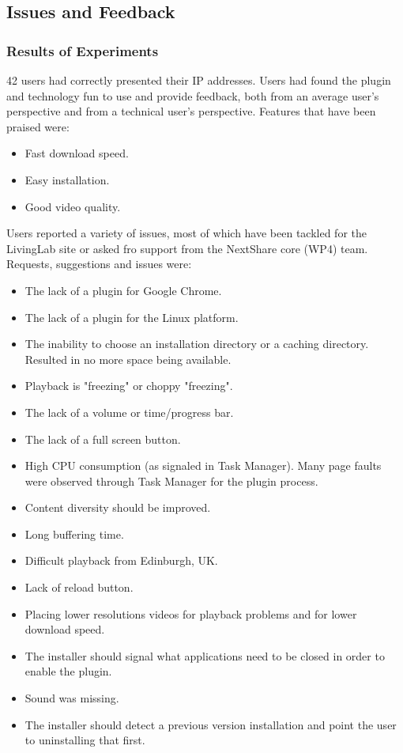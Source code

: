 \subsection{Issues and Feedback}
\label{subsec:multimedia-dist:evaluation-issues}

\subsubsection{Results of Experiments}

42 users had correctly presented their IP addresses. Users had found the
plugin and technology fun to use and provide feedback, both from an average
user's perspective and from a technical user's perspective. Features that have
been praised were:
\begin{itemize}
  \item Fast download speed.
  \item Easy installation.
  \item Good video quality.
\end{itemize}

Users reported a variety of issues, most of which have been tackled for the
LivingLab site or asked fro support from the NextShare core (WP4) team.
Requests, suggestions and issues were:
\begin{itemize}
  \item The lack of a plugin for Google Chrome.
  \item The lack of a plugin for the Linux platform.
  \item The inability to choose an installation directory or a caching
  directory. Resulted in no more space being available.
  \item Playback is "freezing" or choppy "freezing".
  \item The lack of a volume or time/progress bar.
  \item The lack of a full screen button.
  \item High CPU consumption (as signaled in Task Manager). Many page faults
  were observed through Task Manager for the plugin process.
  \item Content diversity should be improved.
  \item Long buffering time.
  \item Difficult playback from Edinburgh, UK.
  \item Lack of reload button.
  \item Placing lower resolutions videos for playback problems and for lower
  download speed.
  \item The installer should signal what applications need to be closed in
  order to enable the plugin.
  \item Sound was missing.
  \item The installer should detect a previous version installation and point
  the user to uninstalling that first.
\end{itemize}

